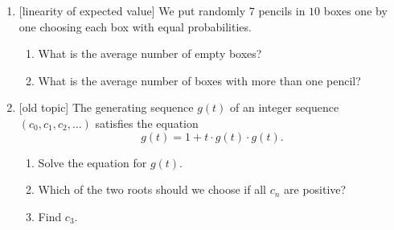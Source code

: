 \documentclass[12pt]{article}
\begin{document}
\begin{enumerate}
    \begin{enumerate}[label=\alph*)]
        \item Draw an example of such a graph.
        \item You have $10$ colours available. In how many ways can you color the vertices of this graph if adjacent vertices should be painted differently?
    \end{enumerate}

        
    \item {[linearity of expected value]} We put randomly $7$ pencils in $10$ boxes one by one choosing each box with equal probabilities.
\begin{enumerate}[label=\alph*)]
  \item What is the average number of empty boxes?
  \item What is the average number of boxes with more than one pencil?
\end{enumerate}


    \item {[old topic]} The generating sequence $g(t)$ of an integer sequence $(c_0, c_1, c_2, \dots)$ satisfies the equation 
    \[
    g(t) = 1 + t \cdot g(t) \cdot g(t).
    \]
    \begin{enumerate}
        \item Solve the equation for $g(t)$.
        \item Which of the two roots should we choose if all $c_n$ are positive?
        \item Find $c_3$.
    \end{enumerate}


\end{enumerate}
\end{document}

